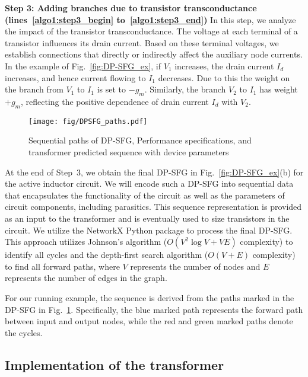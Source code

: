 {\noindent
\textbf{Step 3: Adding branches due to transistor transconductance (lines~\ref{algo1:step3_begin} to~\ref{algo1:step3_end})} 
In this step, we analyze the impact of the transistor transconductance. The voltage at each terminal of a transistor influences its drain current. Based on these terminal voltages, we establish connections that directly or indirectly affect the auxiliary node currents. In the example of Fig.~\ref{fig:DP-SFG_ex}, if $V_1$ increases, the drain current $I_d$ increases, and hence current flowing to $I_1$ decreases. Due to this the weight on the branch from $V_1$ to $I_1$ is set to $-g_m$. Similarly, the branch $V_2$ to $I_1$ has weight $+g_m$, reflecting the positive dependence of drain current $I_d$ with $V_2$. 

\begin{figure}[ht]
  \centering
  \texttt{[image: fig/DPSFG\_paths.pdf]} %
  \vspace{-0.5cm}
  \caption{Sequential paths of DP-SFG, Performance specifications, and transformer predicted sequence with device parameters}
  \label{fig:seq}
  \vspace{-0.4cm}
\end{figure}

At the end of Step~3, we obtain the final DP-SFG in Fig.~\ref{fig:DP-SFG_ex}(b) for the active inductor circuit. We will encode such a DP-SFG into sequential data that encapsulates the functionality of the circuit as well as the parameters of circuit components, including parasitics. This sequence representation is provided as an input to the transformer and is eventually used to size transistors in the circuit. We utilize the NetworkX Python package to process the final DP-SFG. This approach utilizes Johnson's algorithm ($O(V^2 \log V + VE)$ complexity) to identify all cycles and the depth-first search algorithm ($O(V + E)$ complexity) to find all forward paths, where $V$ represents the number of nodes and $E$ represents the number of edges in the graph.

For our running example, the sequence is derived from the paths 
marked in the DP-SFG in Fig.~\ref{fig:seq}.
Specifically, the blue marked path represents the forward path between input and output nodes, while the red and green marked paths denote the cycles. 
}

\subsection{Implementation of the transformer}

